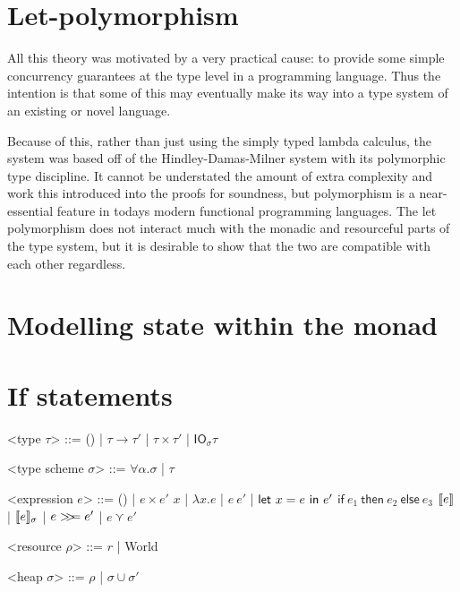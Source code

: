\section{Let-polymorphism}
All this theory was motivated by a very practical cause: to provide
some simple concurrency guarantees at the type level in a programming
language. Thus the intention is that some of this may eventually make
its way into a type system of an existing or novel language.

Because of this, rather than just using the simply typed lambda
calculus, the system was based off of the Hindley-Damas-Milner system
with its polymorphic type discipline. It cannot be understated the
amount of extra complexity and work this introduced into the proofs
for soundness, but polymorphism is a near-essential feature in todays
modern functional programming languages. The let polymorphism does not
interact much with the monadic and resourceful parts of the type
system, but it is desirable to show that the two are compatible with
each other regardless.

\section{Modelling state within the monad} \label{section:modellingstate}

\section{If statements}

\begin{grammar}

  <type $\tau$> ::= () | $\tau \rightarrow \tau'$ | $\tau \times \tau'$ | $\textsf{IO}_\sigma \tau$
  
  <type scheme $\sigma$> ::= $\forall \alpha . \sigma$ | $\tau$

  <expression $e$> ::= () | $e \times e'$
  \alt $x$ | $\lambda x . e$ | $e \ e'$ | $\mathsf{let} \ x = e \ \mathsf{in} \ e'$
  \alt $\textsf{if} \ e_1 \ \textsf{then} \ e_2 \ \textsf{else} \ e_3$
  \alt $[\![ e]\!]$ | $[\![ e]\!]_\sigma$ | $e >\!\!>\!\!= e'$ | $e \curlyvee e'$

  <resource $\rho$> ::= $r$ | \textsf{World}

  <heap $\sigma$> ::= $\rho$ | $\sigma \cup \sigma'$

\end{grammar}

